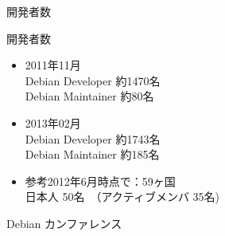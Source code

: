 
\begin{frame}
\begin{center}
\LARGE{開発者数}
\end{center}
\end{frame}


\begin{frame}{開発者数}
\begin{itemize}[<+->]
\item 2011年11月\\
Debian Developer 約1470名 \\
Debian Maintainer 約80名

\item 2013年02月\\
Debian Developer 約1743名 \\
Debian Maintainer 約185名

\item 参考2012年6月時点で：59ヶ国\\
日本人  50名　（アクティブメンバ 35名)

\end{itemize}
\end{frame}

\begin{frame}
\begin{center}
\LARGE{Debian カンファレンス}
\end{center}
\end{frame}

